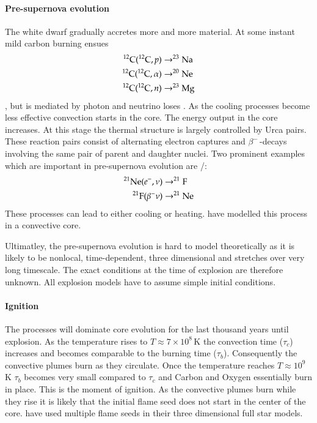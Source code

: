 \paragraph{Pre-supernova evolution}
The white dwarf gradually accretes more and more material. At some instant mild carbon burning ensues
\begin{align}
\nonumber
\Carb(\Carb,p) &\rightarrow \Na \\  \nonumber
\Carb(\Carb,\alpha) &\rightarrow \Ne \\ 
\Carb(\Carb,n) &\rightarrow \Mg[23]
\end{align},
but is mediated by photon and neutrino loses \citep{2005NuPhA.758..463L, 2007nps..book.....I}. As the cooling processes become less effective convection starts in the core. The energy output in the core increases. At this stage the thermal structure is largely controlled by Urca pairs. These reaction pairs consist of alternating electron captures and $\beta^-$\,-decays involving the same pair of parent and daughter nuclei. Two prominent examples which are important in pre-supernova evolution are \Ne[21]/\F[21]:
\begin{align}
\nonumber
\Ne[21](e^-, \nu) &\rightarrow \F[21] \\
\F[21](\beta^- \nu) &\rightarrow \Ne[21]
\end{align}
These processes can lead to either cooling or heating. \cite{2005NuPhA.758..463L} have modelled this process in a convective core. 

Ultimatley, the pre-supernova evolution is hard to model theoretically as it is likely to be nonlocal, time-dependent, three dimensional and stretches over very long timescale. The exact conditions at the time of explosion are therefore unknown. All explosion models have to assume simple initial conditions. 

\paragraph{Ignition}
The \urca processes will dominate core evolution for the last thousand years until explosion. As the temperature rises to $T\approx7 \times 10^8$\,K \citep{2000ARA&A..38..191H} the convection time ($\tau_c$) increases and becomes comparable to the burning time ($\tau_b$). Consequently the convective plumes burn as they circulate. Once the temperature reaches $T\approx 10^9$\,K $\tau_b$ becomes very small compared to $\tau_c$ and Carbon and Oxygen essentially burn in place. 
This is the moment of ignition. As the convective plumes burn while they rise it is likely that the initial flame seed does not start in the center of the core. \cite{2005A&A...431..635R} have used multiple flame seeds in their three dimensional full star models.  


